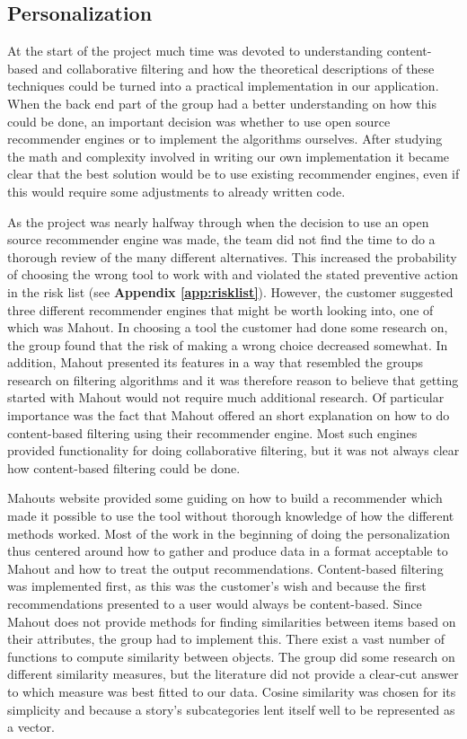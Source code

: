 \subsection{Personalization}

At the start of the project much time was devoted to understanding content-based and collaborative filtering and how the theoretical descriptions of these techniques could be turned into a practical implementation in our application. When the back end part of the group had a better understanding on how this could be done, an important decision was whether to use open source recommender engines or to implement the algorithms ourselves. After studying the math and complexity involved in writing our own implementation it became clear that the best solution would be to use existing recommender engines, even if this would require some adjustments to already written code. \newline

As the project was nearly halfway through when the decision to use an open source recommender engine was made, the team did not find the time to do a thorough review of the many different alternatives. This increased the probability of choosing the wrong tool to work with and violated the stated preventive action in the risk list (see \textbf{Appendix \ref{app:risklist}}). However, the customer suggested three different recommender engines that might be worth looking into, one of which was Mahout. In choosing a tool the customer had done some research on, the group found that the risk of making a wrong choice decreased somewhat. In addition, Mahout presented its features in a way that resembled the groups research on filtering algorithms and it was therefore reason to believe that getting started with Mahout would not require much additional research. Of particular importance was the fact that Mahout offered an short explanation on how to do content-based filtering using their recommender engine. Most such engines provided functionality for doing collaborative filtering, but it was not always clear how content-based filtering could be done.\newline

Mahouts website provided some guiding on how to build a recommender which made it possible to use the tool without thorough knowledge of how the different methods worked. Most of the work in the beginning of doing the personalization thus centered around how to gather and produce data in a format acceptable to Mahout and how to treat the output recommendations. Content-based filtering was implemented first, as this was the customer's wish and because the first recommendations presented to a user would always be content-based. Since Mahout does not provide methods for finding similarities between items based on their attributes, the group had to implement this. There exist a vast number of functions to compute similarity between objects. The group did some research on different similarity measures, but the literature did not provide a clear-cut answer to which measure was best fitted to our data. Cosine similarity was chosen for its simplicity and because a story's subcategories lent itself well to be represented as a vector.\newline

